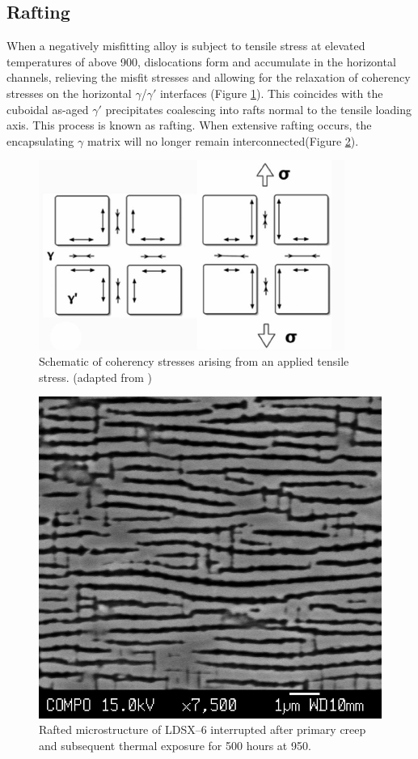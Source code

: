 \subsection{Rafting}
When a negatively misfitting alloy is subject to tensile stress at elevated temperatures of above 900\celsius, dislocations form and accumulate in the horizontal channels, relieving the misfit stresses and allowing for the relaxation of coherency stresses on the horizontal $\gamma$/$\gamma'$ interfaces (Figure \ref{fig:CoherencyStress}). This coincides with the cuboidal as-aged $\gamma'$ precipitates coalescing into rafts normal to the tensile loading axis.  This process is known as rafting.  When extensive rafting occurs, the encapsulating $\gamma$ matrix will no longer remain interconnected(Figure \ref{fig:LDSX6rafts}).  
%
\begin{figure}[H]
\begin{center}
\includegraphics[width=10cm]{CoherencyStress}
\caption{Schematic of coherency stresses arising from an applied tensile stress. (adapted from \cite{reed06})}
\label{fig:CoherencyStress}
\end{center}
\end{figure}
%
\begin{figure}[H]
\begin{center}
\includegraphics{LDSX6rafts}
\caption{Rafted microstructure of LDSX--6 interrupted after primary creep and subsequent thermal exposure for 500 hours at 950\celsius.}
\label{fig:LDSX6rafts}
\end{center}
\end{figure}
